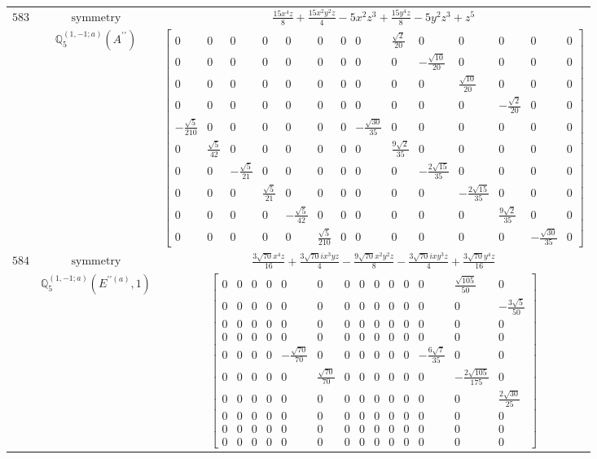 \documentclass[fleqn,8pt,landscape]{jsarticle}
\begin{document}
\begin{longtable}{ccc}
$ 583 $ & $ \text{symmetry} $ & $ \frac{15 x^{4} z}{8} + \frac{15 x^{2} y^{2} z}{4} - 5 x^{2} z^{3} + \frac{15 y^{4} z}{8} - 5 y^{2} z^{3} + z^{5} $ \\
$  $ & $ \mathbb{Q}_{5}^{(1,-1;a)}(A^{\prime\prime}) $ & $ \begin{bmatrix} 0 & 0 & 0 & 0 & 0 & 0 & 0 & 0 & \frac{\sqrt{2}}{20} & 0 & 0 & 0 & 0 & 0 \\ 0 & 0 & 0 & 0 & 0 & 0 & 0 & 0 & 0 & - \frac{\sqrt{10}}{20} & 0 & 0 & 0 & 0 \\ 0 & 0 & 0 & 0 & 0 & 0 & 0 & 0 & 0 & 0 & \frac{\sqrt{10}}{20} & 0 & 0 & 0 \\ 0 & 0 & 0 & 0 & 0 & 0 & 0 & 0 & 0 & 0 & 0 & - \frac{\sqrt{2}}{20} & 0 & 0 \\ - \frac{\sqrt{5}}{210} & 0 & 0 & 0 & 0 & 0 & 0 & - \frac{\sqrt{30}}{35} & 0 & 0 & 0 & 0 & 0 & 0 \\ 0 & \frac{\sqrt{5}}{42} & 0 & 0 & 0 & 0 & 0 & 0 & \frac{9 \sqrt{2}}{35} & 0 & 0 & 0 & 0 & 0 \\ 0 & 0 & - \frac{\sqrt{5}}{21} & 0 & 0 & 0 & 0 & 0 & 0 & - \frac{2 \sqrt{15}}{35} & 0 & 0 & 0 & 0 \\ 0 & 0 & 0 & \frac{\sqrt{5}}{21} & 0 & 0 & 0 & 0 & 0 & 0 & - \frac{2 \sqrt{15}}{35} & 0 & 0 & 0 \\ 0 & 0 & 0 & 0 & - \frac{\sqrt{5}}{42} & 0 & 0 & 0 & 0 & 0 & 0 & \frac{9 \sqrt{2}}{35} & 0 & 0 \\ 0 & 0 & 0 & 0 & 0 & \frac{\sqrt{5}}{210} & 0 & 0 & 0 & 0 & 0 & 0 & - \frac{\sqrt{30}}{35} & 0 \end{bmatrix} $ \\ \hline
$ 584 $ & $ \text{symmetry} $ & $ \frac{3 \sqrt{70} x^{4} z}{16} + \frac{3 \sqrt{70} i x^{3} y z}{4} - \frac{9 \sqrt{70} x^{2} y^{2} z}{8} - \frac{3 \sqrt{70} i x y^{3} z}{4} + \frac{3 \sqrt{70} y^{4} z}{16} $ \\
$  $ & $ \mathbb{Q}_{5}^{(1,-1;a)}(E^{\prime\prime(a)},1) $ & $ \begin{bmatrix} 0 & 0 & 0 & 0 & 0 & 0 & 0 & 0 & 0 & 0 & 0 & 0 & \frac{\sqrt{105}}{50} & 0 \\ 0 & 0 & 0 & 0 & 0 & 0 & 0 & 0 & 0 & 0 & 0 & 0 & 0 & - \frac{3 \sqrt{5}}{50} \\ 0 & 0 & 0 & 0 & 0 & 0 & 0 & 0 & 0 & 0 & 0 & 0 & 0 & 0 \\ 0 & 0 & 0 & 0 & 0 & 0 & 0 & 0 & 0 & 0 & 0 & 0 & 0 & 0 \\ 0 & 0 & 0 & 0 & - \frac{\sqrt{70}}{70} & 0 & 0 & 0 & 0 & 0 & 0 & - \frac{6 \sqrt{7}}{35} & 0 & 0 \\ 0 & 0 & 0 & 0 & 0 & \frac{\sqrt{70}}{70} & 0 & 0 & 0 & 0 & 0 & 0 & - \frac{2 \sqrt{105}}{175} & 0 \\ 0 & 0 & 0 & 0 & 0 & 0 & 0 & 0 & 0 & 0 & 0 & 0 & 0 & \frac{2 \sqrt{30}}{25} \\ 0 & 0 & 0 & 0 & 0 & 0 & 0 & 0 & 0 & 0 & 0 & 0 & 0 & 0 \\ 0 & 0 & 0 & 0 & 0 & 0 & 0 & 0 & 0 & 0 & 0 & 0 & 0 & 0 \\ 0 & 0 & 0 & 0 & 0 & 0 & 0 & 0 & 0 & 0 & 0 & 0 & 0 & 0 \end{bmatrix} $ \\ \hline

\end{longtable}
\end{document}
